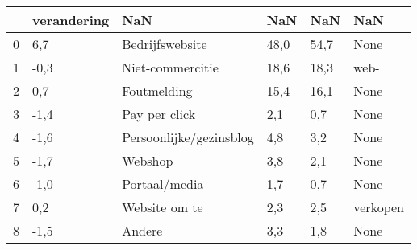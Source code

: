\begin{tabular}{llllll}
\toprule
{} & verandering &                      NaN &   NaN &   NaN &       NaN \\
\midrule
0 &         6,7 &          Bedrijfswebsite &  48,0 &  54,7 &      None \\
1 &        -0,3 &         Niet-commercitie &  18,6 &  18,3 &      web- \\
2 &         0,7 &              Foutmelding &  15,4 &  16,1 &      None \\
3 &        -1,4 &            Pay per click &   2,1 &   0,7 &      None \\
4 &        -1,6 &  Persoonlijke/gezinsblog &   4,8 &   3,2 &      None \\
5 &        -1,7 &                  Webshop &   3,8 &   2,1 &      None \\
6 &        -1,0 &            Portaal/media &   1,7 &   0,7 &      None \\
7 &         0,2 &            Website om te &   2,3 &   2,5 &  verkopen \\
8 &        -1,5 &                   Andere &   3,3 &   1,8 &      None \\
\bottomrule
\end{tabular}
